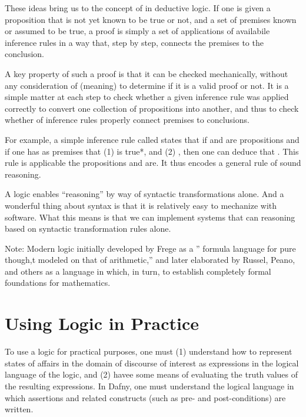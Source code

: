 \documentclass[letterpaper,10pt,english]{sphinxmanual}
\begin{document}
These ideas bring us to the concept of  in deductive logic. If
one is given a proposition that is not yet known to be true or not,
and a set of premises known or assumed to be true, a proof is simply a
set of applications of availabile inference rules in a way that, step
by step, connects the premises  to the conclusion.

A key property of such a proof is that it can be checked mechanically,
without any consideration of  (meaning) to determine if it
is a valid proof or not. It is a simple matter at each step to check
whether a given inference rule was applied correctly to convert one
collection of propositions into another, and thus to check whether
 of inference rules properly connect premises to conclusions.

For example, a simple inference rule called  states that
if  and  are propositions and if one has as premises that (1)
 is true*, and (2) , then one can
deduce that . This rule is applicable  the
propositions  and  are. It thus encodes a general rule of sound
reasoning.

A logic enables  “reasoning” by way of syntactic
transformations alone. And a wonderful thing about syntax is that it
is relatively easy to mechanize with software. What this means is that
we can implement systems that can reasoning  based on
syntactic transformation rules alone.

Note: Modern logic initially developed by Frege as a ” formula
language for pure though,t modeled on that of arithmetic,” and later
elaborated by Russel, Peano, and others as a language in which, in
turn, to establish completely formal foundations for mathematics.


\section{Using Logic in Practice}
\label{\detokenize{11-propositional-logic:using-logic-in-practice}}
To use a logic for practical purposes, one must (1) understand how to
represent states of affairs in the domain of discourse of interest as
expressions in the logical language of the logic, and (2) havee some
means of evaluating the truth values of the resulting expressions. In
Dafny, one must understand the logical language in which assertions
and related constructs (such as pre- and post-conditions) are written.
\end{document}
